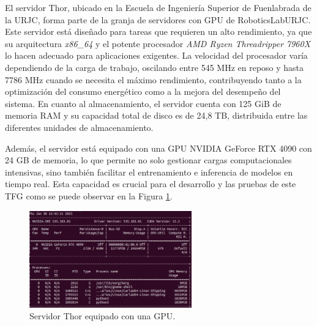 El servidor Thor, ubicado en la Escuela de Ingeniería Superior de Fuenlabrada de la \ac{URJC}, forma parte de la granja de servidores con \ac{GPU} de RoboticsLabURJC. Este servidor está diseñado para tareas que requieren un alto rendimiento, ya que su arquitectura \textit{x86\_64} y el potente procesador \textit{AMD Ryzen Threadripper 7960X} lo hacen adecuado para aplicaciones exigentes. La velocidad del procesador varía dependiendo de la carga de trabajo, oscilando entre 545 MHz en reposo y hasta 7786 MHz cuando se necesita el máximo rendimiento, contribuyendo tanto a la optimización del consumo energético como a la mejora del desempeño del sistema. En cuanto al almacenamiento, el servidor cuenta con 125 GiB de memoria \ac{RAM} y su capacidad total de disco es de 24,8 TB, distribuida entre las diferentes unidades de almacenamiento.

Además, el servidor está equipado con una \ac{GPU} NVIDIA GeForce RTX 4090 con 24 GB de memoria, lo que permite no solo gestionar cargas computacionales intensivas, sino también facilitar el entrenamiento e inferencia de modelos en tiempo real. Esta capacidad es crucial para el desarrollo y las pruebas de este \ac{TFG} como se puede observar en la Figura \ref{fig:thor_nvidia}.

\begin{figure}[ht]
  \centering
  \includegraphics[width=7cm]{figs/Plataformas_Desarollo/thor.png}
  \caption{Servidor Thor equipado con una \ac{GPU}.}
  \label{fig:thor_nvidia}
\end{figure}









